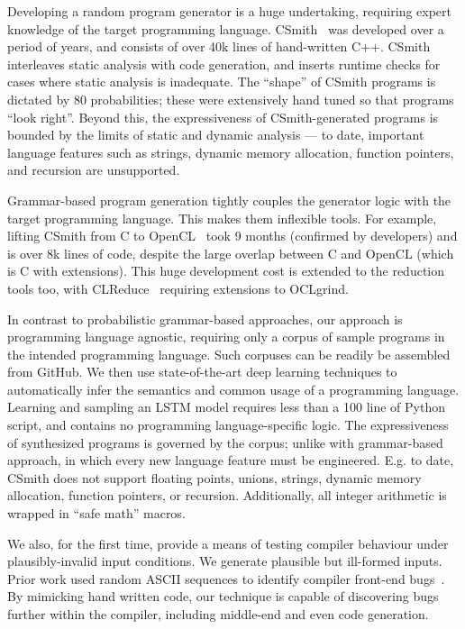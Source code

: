 Developing a random program generator is a huge undertaking, requiring expert knowledge of the target programming language. CSmith~\cite{Yang2011} was developed over a period of years, and consists of over 40k lines of hand-written C++. CSmith interleaves static analysis with code generation, and inserts runtime checks for cases where static analysis is inadequate. The ``shape'' of CSmith programs is dictated by 80 probabilities; these were extensively hand tuned so that programs ``look right''. Beyond this, the expressiveness of CSmith-generated programs is bounded by the limits of static and dynamic analysis --- to date, important language features such as strings, dynamic memory allocation, function pointers, and recursion are unsupported.

Grammar-based program generation tightly couples the generator logic with the target programming language. This makes them inflexible tools. For example, lifting CSmith from C to OpenCL~\cite{Lidbury2015a} took 9 months (confirmed by developers) and is over 8k lines of code, despite the large overlap between C and OpenCL (which is C with extensions). This huge development cost is extended to the reduction tools too, with CLReduce~\cite{Pflanzer2016} requiring extensions to OCLgrind.


In contrast to probabilistic grammar-based approaches, our approach is programming language agnostic, requiring only a corpus of sample programs in the intended programming language. Such corpuses can be readily be assembled from GitHub. We then use state-of-the-art deep learning techniques to automatically infer the semantics and common usage of a programming language. Learning and sampling an LSTM model requires less than a 100 line of Python script, and contains no programming language-specific logic. The expressiveness of synthesized programs is governed by the corpus; unlike with grammar-based approach, in which every new language feature must be engineered. E.g. to date, CSmith does not support floating points, unions, strings, dynamic memory allocation, function pointers, or recursion. Additionally, all integer arithmetic is wrapped in ``safe math'' macros.

We also, for the first time, provide a means of testing compiler behaviour under plausibly-invalid input conditions. We generate plausible but ill-formed inputs. Prior work used random ASCII sequences to identify compiler front-end bugs~\cite{McKeeman1998}. By mimicking hand written code, our technique is capable of discovering bugs further within the compiler, including middle-end and even code generation.

